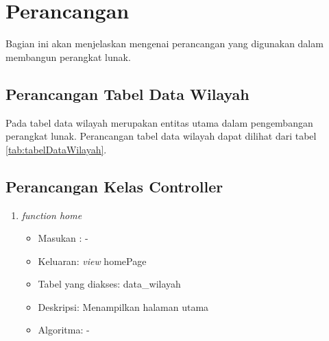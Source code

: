 \chapter{Perancangan}
\label{chap:perancangan}
Bagian ini akan menjelaskan mengenai perancangan yang digunakan dalam membangun perangkat lunak. 


\section{Perancangan Tabel Data Wilayah}
\label{sec:perancanganTabelDataWilayah}
Pada tabel data wilayah merupakan entitas utama dalam pengembangan perangkat lunak. Perancangan tabel data wilayah dapat dilihat dari tabel \ref{tab:tabelDataWilayah}.
\begin{table}[H]
	\centering
	\caption{Rancangan Tabel Data Willayah}
	\label{tab:tabelDataWilayah}
\end{table}


\section{Perancangan Kelas Controller}
\label{sec:perancanganController}
\begin{enumerate}
	\item \textit{function home}
	\begin{itemize}
		\item Masukan : -
		\item Keluaran: \textit{view} homePage
		\item Tabel yang diakses: data\_wilayah
		\item Deskripsi: Menampilkan halaman utama
		\item Algoritma: -
	\end{itemize}
\end{enumerate}
